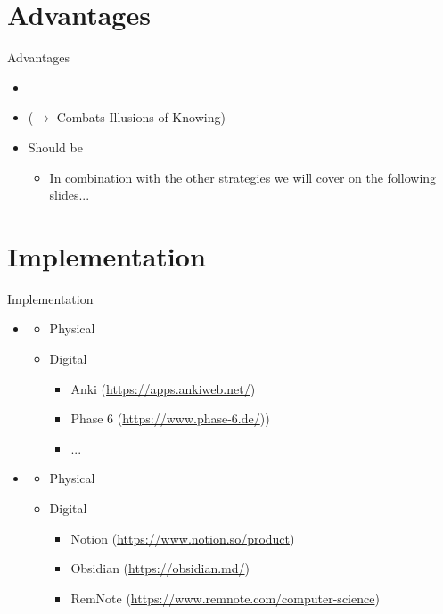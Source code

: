 \documentclass{ercisbeamer}
\begin{document}
\section{Advantages}
\begin{frame}{Advantages}

    \begin{itemize}
        \item {}
        \item {} ($\rightarrow$ Combats Illusions of Knowing)
        \vspace{1em}
        \item Should be 
        \begin{itemize}
            \item In combination with the other strategies we will cover on the following slides...
        \end{itemize}
    \end{itemize}
\end{frame}

\section{Implementation}
\begin{frame}{Implementation}
    \begin{itemize}
        \item {}
        \begin{itemize}
            \item Physical
            \item Digital
            \begin{itemize}
                \item Anki (\url{https://apps.ankiweb.net/})
                \item Phase 6 (\url{https://www.phase-6.de/}))
                \item ...
            \end{itemize}
        \end{itemize}
        \item {}
        \begin{itemize}
            \item Physical
            \item Digital 
            \begin{itemize}
                \item Notion (\url{https://www.notion.so/product})
                \item Obsidian (\url{https://obsidian.md/})
                \item RemNote (\url{https://www.remnote.com/computer-science})
            \end{itemize}
        \end{itemize}
    \end{itemize}
\end{frame}
\end{document}
